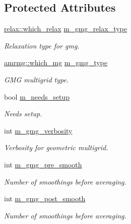 \subsection*{Protected Attributes}
\begin{DoxyCompactItemize}
\item 
\hyperlink{namespacerelax_a1b017edf55c06d103aa5b61e015fe219}{relax\+::which\+\_\+relax} \hyperlink{classpoisson__staircase__gmg_a7b9efb21f3dcd4a5919ad438899cfec4}{m\+\_\+gmg\+\_\+relax\+\_\+type}
\begin{DoxyCompactList}\small\item\em Relaxation type for gmg. \end{DoxyCompactList}\item 
\hyperlink{namespaceamrmg_aa3e75c1253c968e52106305f762a7952}{amrmg\+::which\+\_\+mg} \hyperlink{classpoisson__staircase__gmg_a91d80909dcc02b14adc86a7df9bc89bd}{m\+\_\+gmg\+\_\+type}
\begin{DoxyCompactList}\small\item\em G\+MG multigrid type. \end{DoxyCompactList}\item 
bool \hyperlink{classpoisson__staircase__gmg_a9516ac18769fabd57336395b1edac878}{m\+\_\+needs\+\_\+setup}
\begin{DoxyCompactList}\small\item\em Needs setup. \end{DoxyCompactList}\item 
int \hyperlink{classpoisson__staircase__gmg_ab584ed696824702de480e2cb9fd11eb1}{m\+\_\+gmg\+\_\+verbosity}
\begin{DoxyCompactList}\small\item\em Verbosity for geometric multigrid. \end{DoxyCompactList}\item 
int \hyperlink{classpoisson__staircase__gmg_ab808d62e409de3509aa98b3503ed4169}{m\+\_\+gmg\+\_\+pre\+\_\+smooth}
\begin{DoxyCompactList}\small\item\em Number of smoothings before averaging. \end{DoxyCompactList}\item 
int \hyperlink{classpoisson__staircase__gmg_a043aadcdfe43ebf64be4e1394a75e0f9}{m\+\_\+gmg\+\_\+post\+\_\+smooth}
\begin{DoxyCompactList}\small\item\em Number of smoothings before averaging. \end{DoxyCompactList}\item 

\end{DoxyCompactItemize}
